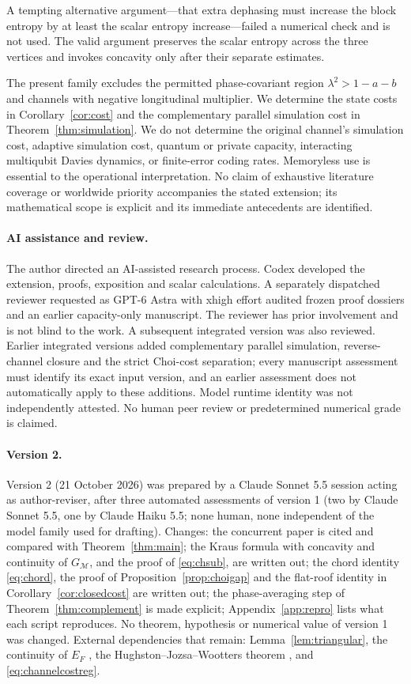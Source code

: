 \documentclass[11pt]{article}
\begin{document}
A tempting alternative argument---that extra dephasing must increase the block entropy by at least the scalar entropy increase---failed a numerical check and is not used. The valid argument preserves the scalar entropy across the three vertices and invokes concavity only after their separate estimates.

The present family excludes the permitted phase-covariant region $\lambda^2>1-a-b$ and channels with negative longitudinal multiplier. We determine the state costs in Corollary~\ref{cor:cost} and the complementary parallel simulation cost in Theorem~\ref{thm:simulation}. We do not determine the original channel's simulation cost, adaptive simulation cost, quantum or private capacity, interacting multiqubit Davies dynamics, or finite-error coding rates. Memoryless use is essential to the operational interpretation. No claim of exhaustive literature coverage or worldwide priority accompanies the stated extension; its mathematical scope is explicit and its immediate antecedents are identified.

\paragraph{AI assistance and review.}
The author directed an AI-assisted research process. Codex developed the extension, proofs, exposition and scalar calculations. A separately dispatched reviewer requested as GPT-6 Astra with xhigh effort audited frozen proof dossiers and an earlier capacity-only manuscript. The reviewer has prior involvement and is not blind to the work. A subsequent integrated version was also reviewed. Earlier integrated versions added complementary parallel simulation, reverse-channel closure and the strict Choi-cost separation; every manuscript assessment must identify its exact input version, and an earlier assessment does not automatically apply to these additions. Model runtime identity was not independently attested. No human peer review or predetermined numerical grade is claimed.

\paragraph{Version 2.}
Version 2 (21 October 2026) was prepared by a Claude Sonnet 5.5 session acting as author-reviser, after three automated assessments of version 1 (two by Claude Sonnet 5.5, one by Claude Haiku 5.5; none human, none independent of the model family used for drafting). Changes: the concurrent paper \cite{fang} is cited and compared with Theorem~\ref{thm:main}; the Kraus formula with concavity and continuity of $G_{\mathcal M}$, and the proof of \eqref{eq:chsub}, are written out; the chord identity \eqref{eq:chord}, the proof of Proposition~\ref{prop:choigap} and the flat-roof identity in Corollary~\ref{cor:closedcost} are written out; the phase-averaging step of Theorem~\ref{thm:complement} is made explicit; Appendix~\ref{app:repro} lists what each script reproduces. No theorem, hypothesis or numerical value of version 1 was changed. External dependencies that remain: Lemma~\ref{lem:triangular}, the continuity of $E_F$ \cite{nielsen,winter}, the Hughston--Jozsa--Wootters theorem \cite{hjw}, and \eqref{eq:channelcostreg}.
\end{document}
